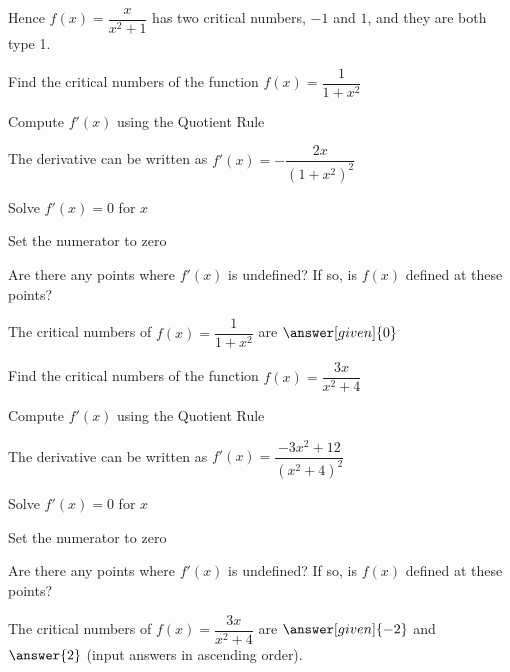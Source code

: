 \documentclass{ximera}
\begin{document}
\begin{description}
Hence $f(x) = \dfrac{x}{x^2 +1}$ has two critical numbers, $-1$ and $1$, and they are both type 1. 


\begin{question} %
  Find the critical numbers of the function $f(x) = \dfrac{1}{1 + x^2}$
  
  
    \begin{hint}
      Compute $f'(x)$ using the Quotient Rule
    \end{hint}
    \begin{hint}
      The derivative can be written as $f'(x) = -\dfrac{2x}{(1 + x^2)^2}$
    \end{hint}
		\begin{hint}
      Solve $f'(x) = 0$ for $x$
    \end{hint}
		\begin{hint}
      Set the numerator to zero
    \end{hint}
    \begin{hint}
      Are there any points where $f'(x)$ is undefined?
      If so, is $f(x)$ defined at these points?  
		\end{hint}
    
    
		The critical numbers of $f(x) = \dfrac{1}{1 + x^2}$ are
		 $\answer[given]{0}$
		
\end{question}

\begin{question} %
  Find the critical numbers of the function $f(x) = \dfrac{3x}{x^2 +4}$
  
  
    \begin{hint}
      Compute $f'(x)$ using the Quotient Rule
    \end{hint}
    \begin{hint}
      The derivative can be written as $f'(x) = \dfrac{-3x^2 + 12}{(x^2 + 4)^2}$
    \end{hint}
		\begin{hint}
      Solve $f'(x) = 0$ for $x$
    \end{hint}
		\begin{hint}
      Set the numerator to zero
    \end{hint}
    \begin{hint}
      Are there any points where $f'(x)$ is undefined?
      If so, is $f(x)$ defined at these points?  
		\end{hint}
    
    
		The critical numbers of $f(x) = \dfrac{3x}{x^2 + 4}$ are
		 $\answer[given]{-2}$ and $\answer{2}$ 
		(input answers in ascending order).
	

\end{question}
\end{description}
\end{document}
